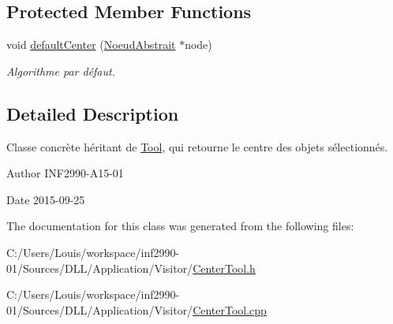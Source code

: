 \subsection*{Protected Member Functions}
\begin{DoxyCompactItemize}
\item 
void \hyperlink{group__inf2990_gab64cc9d2d491c0bd04a1efc4756740df}{default\+Center} (\hyperlink{class_noeud_abstrait}{Noeud\+Abstrait} $\ast$node)
\begin{DoxyCompactList}\small\item\em Algorithme par défaut. \end{DoxyCompactList}\end{DoxyCompactItemize}


\subsection{Detailed Description}
Classe concrète héritant de \hyperlink{class_tool}{Tool}, qui retourne le centre des objets sélectionnés. 

\begin{DoxyAuthor}{Author}
I\+N\+F2990-\/\+A15-\/01 
\end{DoxyAuthor}
\begin{DoxyDate}{Date}
2015-\/09-\/25 
\end{DoxyDate}


The documentation for this class was generated from the following files\+:\begin{DoxyCompactItemize}
\item 
C\+:/\+Users/\+Louis/workspace/inf2990-\/01/\+Sources/\+D\+L\+L/\+Application/\+Visitor/\hyperlink{_center_tool_8h}{Center\+Tool.\+h}\item 
C\+:/\+Users/\+Louis/workspace/inf2990-\/01/\+Sources/\+D\+L\+L/\+Application/\+Visitor/\hyperlink{_center_tool_8cpp}{Center\+Tool.\+cpp}\end{DoxyCompactItemize}
